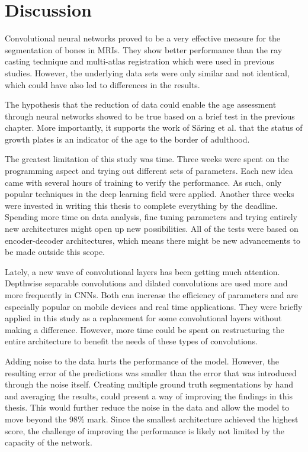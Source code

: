 \section{Discussion}

Convolutional neural networks proved to be a very effective measure for the segmentation of bones in MRIs. They show better performance than the ray casting technique and multi-atlas registration which were used in previous studies. However, the underlying data sets were only similar and not identical, which could have also led to differences in the results.

The hypothesis that the reduction of data could enable the age assessment through neural networks showed to be true based on a brief test in the previous chapter. More importantly, it supports the work of Säring et al. \cite{Saring2014} that the status of growth plates is an indicator of the age to the border of adulthood.

The greatest limitation of this study was time. Three weeks were spent on the programming aspect and trying out different sets of parameters. Each new idea came with several hours of training to verify the performance. As such, only popular techniques in the deep learning field were applied. Another three weeks were invested in writing this thesis to complete everything by the deadline. Spending more time on data analysis, fine tuning parameters and trying entirely new architectures might open up new possibilities. All of the tests were based on encoder-decoder architectures, which means there might be new advancements to be made outside this scope.

Lately, a new wave of convolutional layers has been getting much attention. Depthwise separable convolutions and dilated convolutions are used more and more frequently in CNNs. Both can increase the efficiency of parameters and are especially popular on mobile devices and real time applications. They were briefly applied in this study as a replacement for some convolutional layers without making a difference. However, more time could be spent on restructuring the entire architecture to benefit the needs of these types of convolutions.

Adding noise to the data hurts the performance of the model. However, the resulting error of the predictions was smaller than the error that was introduced through the noise itself. Creating multiple ground truth segmentations by hand and averaging the results, could present a way of improving the findings in this thesis. This would further reduce the noise in the data and allow the model to move beyond the 98\% mark. Since the smallest architecture achieved the highest score, the challenge of improving the performance is likely not limited by the capacity of the network.

